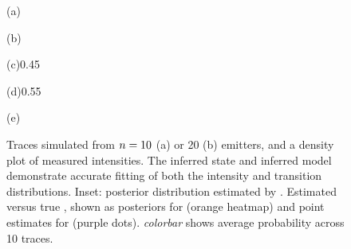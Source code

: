 \begin{figure}

  \begin{panel}{(a)}{\textwidth}
    \hspace{-2mm}%
    \setlength\plotwidth{\textwidth}%
    \setlength\plotheight{36mm}%
    
    \vspace{-4mm}
  \end{panel}

  \begin{panel}{(b)}{\textwidth}
    \hspace{-2mm}
    \setlength\plotwidth{\textwidth}%
    \setlength\plotheight{36mm}%
    
    \vspace{-4mm}
  \end{panel}

  \begin{panel}{(c)}{0.45\textwidth}
    \setlength\plotwidth{72mm}%
    \setlength\plotheight{72mm}%
    
  \end{panel}
  \hspace{1cm}
  \begin{panel}{(d)}{0.55\textwidth}
    \begin{panel}{}{\textwidth}
      \hspace{5mm}%
      \small%
      \setlength\plotwidth{65mm}%
      \setlength\plotheight{22mm}%
    \end{panel}
    \begin{panel}{(e)}{\textwidth}
      \hspace{5mm}%
      \small%
      \setlength\plotwidth{65mm}%
      \setlength\plotheight{22mm}%
    \end{panel}
  \end{panel}

  \caption{
     Traces simulated from $n=10$ (a) or 20 (b) emitters, and a density plot of measured intensities.
    The inferred state and inferred model demonstrate accurate fitting of both the intensity and transition distributions.
    Inset: posterior distribution estimated by \ours.
     Estimated versus true \n, shown as posteriors for \ours
    (orange heatmap) and point estimates for \lbfcs (purple dots). \textit{colorbar} 
    shows average probability across 10 traces.
    \captbc
  }
\end{figure}
\begin{figure}
  \label{fig:results:sim_counting}

\end{figure}
